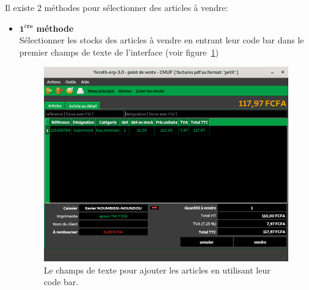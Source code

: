 Il existe $2$ m\'ethodes pour s\'electionner des articles
\`a vendre:
\begin{itemize}[]
	\item \textcolor{purplish}{$\mathbf{1^{\text{\`ere}}}$ \textbf{m\'ethode}}\\
	S\'electionner les stocks des articles \`a vendre
	en entrant leur code bar dans le premier champs de texte
	de l'interface (voir figure~\ref{fig:yeren-vendre-choisir-stock-codebar})
	\begin{figure}[!htbp]
		\centering
		\includegraphics[scale=0.63]{images/yeren-vendre-choisir-stock-codebar.png}
		\caption{Le champs de texte pour
			ajouter les articles en utilisant leur code bar.}\label{fig:yeren-vendre-choisir-stock-codebar}
	\end{figure}
	

\end{itemize}
